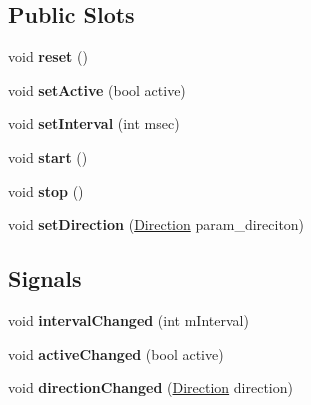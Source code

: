 \subsection*{Public Slots}
\begin{DoxyCompactItemize}
\item 
\mbox{\label{class_q_qt_marquee_label_a00e4825702b0227bb8d09049646497d7}} 
void {\bfseries reset} ()
\item 
\mbox{\label{class_q_qt_marquee_label_a8a3c12930e24e59d690568ef7238f0b5}} 
void {\bfseries set\+Active} (bool active)
\item 
\mbox{\label{class_q_qt_marquee_label_a07d234bb983cae7158b95dd74daf4621}} 
void {\bfseries set\+Interval} (int msec)
\item 
\mbox{\label{class_q_qt_marquee_label_a2d7c3f014a0f0cf541c6a7660c14d7f4}} 
void {\bfseries start} ()
\item 
\mbox{\label{class_q_qt_marquee_label_a407c42a4acef64802739a31d33d64296}} 
void {\bfseries stop} ()
\item 
\mbox{\label{class_q_qt_marquee_label_a4ece32e843a3434d74668ba26bcd5ad0}} 
void {\bfseries set\+Direction} (\mbox{\hyperlink{class_q_qt_marquee_label_a9c93af95a748dfd57f793883281822a7}{Direction}} param\+\_\+direciton)
\end{DoxyCompactItemize}
\subsection*{Signals}
\begin{DoxyCompactItemize}
\item 
\mbox{\label{class_q_qt_marquee_label_a126ca312c42437d22c7a97e4541fdb92}} 
void {\bfseries interval\+Changed} (int m\+Interval)
\item 
\mbox{\label{class_q_qt_marquee_label_a8d0deaba73c111d8d8057e54f394c81f}} 
void {\bfseries active\+Changed} (bool active)
\item 
\mbox{\label{class_q_qt_marquee_label_a77ddc1f724cea2513f3e8b8ddfa84ff1}} 
void {\bfseries direction\+Changed} (\mbox{\hyperlink{class_q_qt_marquee_label_a9c93af95a748dfd57f793883281822a7}{Direction}} direction)
\end{DoxyCompactItemize}
